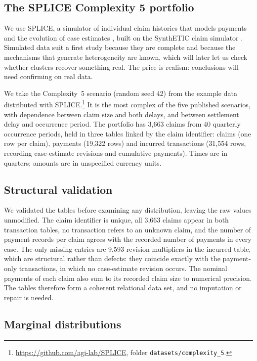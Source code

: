 \subsection{The SPLICE Complexity 5 portfolio}
\label{sec:splice}

We use SPLICE, a simulator of individual claim histories that models payments and the evolution of case estimates \parencite{avanzi2023splice}, built on the SynthETIC claim simulator \parencite{avanzi2021synthetic}. Simulated data suit a first study because they are complete and because the mechanisms that generate heterogeneity are known, which will later let us check whether clusters recover something real. The price is realism: conclusions will need confirming on real data.

We take the Complexity~5 scenario (random seed 42) from the example data distributed with SPLICE.\footnote{\url{https://github.com/agi-lab/SPLICE}, folder \texttt{datasets/complexity\_5}.} It is the most complex of the five published scenarios, with dependence between claim size and both delays, and between settlement delay and occurrence period. The portfolio has 3,663 claims from 40 quarterly occurrence periods, held in three tables linked by the claim identifier: claims (one row per claim), payments (19,322 rows) and incurred transactions (31,554 rows, recording case-estimate revisions and cumulative payments). Times are in quarters; amounts are in unspecified currency units.

\subsection{Structural validation}
\label{sec:validation}

We validated the tables before examining any distribution, leaving the raw values unmodified. The claim identifier is unique, all 3,663 claims appear in both transaction tables, no transaction refers to an unknown claim, and the number of payment records per claim agrees with the recorded number of payments in every case. The only missing entries are 9,593 revision multipliers in the incurred table, which are structural rather than defects: they coincide exactly with the payment-only transactions, in which no case-estimate revision occurs. The nominal payments of each claim also sum to its recorded claim size to numerical precision. The tables therefore form a coherent relational data set, and no imputation or repair is needed.

\subsection{Marginal distributions}
\label{sec:marginals}


